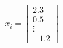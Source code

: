 \documentclass[preview]{standalone}
\begin{document}
\begin{align*}
x_i = \begin{bmatrix} 2.3 \\ 0.5 \\ \vdots \\ -1.2 \end{bmatrix}
\end{align*}
\end{document}
